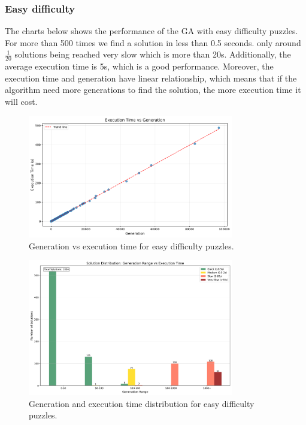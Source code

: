 \subsubsection{Easy difficulty}

The charts below shows the performance of the GA with easy difficulty puzzles. For more than 500 times we find a solution in less than 0.5 seconds. only around \(\frac{1}{20}\) solutions being reached very slow which is more than 20s.
Additionally, the average execution time is 5s, which is a good performance. Moreover, the execution time and generation have linear relationship, which means that if the algorithm need more generations to find the solution, the more execution time it will cost.

\begin{figure}[H]
\centering
\includegraphics[width=0.8\textwidth]{resources/generation_vs_execution_time_easy.png}
\caption{Generation vs execution time for easy difficulty puzzles.}
\label{fig:generation_vs_execution_time_easy}
\end{figure}

\begin{figure}[H]
\centering
\includegraphics[width=0.8\textwidth]{resources/generation_execution_time_bars_easy.png}
\caption{Generation and execution time distribution for easy difficulty puzzles.}
\label{fig:generation_execution_time_bars_easy}
\end{figure}

